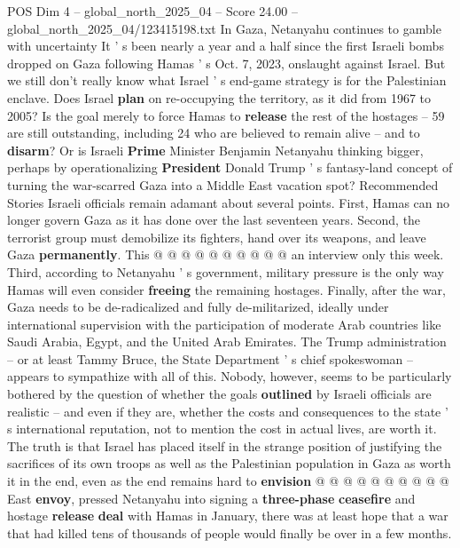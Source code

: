 \begin{textsample}{POS Dim 4 – global\_north\_2025\_04 – Score 24.00 – global\_north\_2025\_04/123415198.txt}  \label{ex:f4_pos_215}
In Gaza, Netanyahu continues to gamble with uncertainty It ' s been nearly a year and a half since the first Israeli bombs dropped on Gaza following Hamas ' s Oct. 7, 2023, onslaught against Israel.
But we still don't really know what Israel ' s end-game strategy is for the Palestinian enclave.
Does Israel \textbf{plan} on re-occupying the territory, as it did from 1967 to 2005?
Is the goal merely to force Hamas to \textbf{release} the rest of the hostages -- 59 are still outstanding, including 24 who are believed to remain alive -- and to \textbf{disarm}?
Or is Israeli \textbf{Prime} Minister Benjamin Netanyahu thinking bigger, perhaps by operationalizing \textbf{President} Donald Trump ' s fantasy-land concept of turning the war-scarred Gaza into a Middle East vacation spot?
Recommended Stories Israeli officials remain adamant about several points.
First, Hamas can no longer govern Gaza as it has done over the last seventeen years.
Second, the terrorist group must demobilize its fighters, hand over its weapons, and leave Gaza \textbf{permanently}.
This @ @ @ @ @ @ @ @ @ @ an interview only this week.
Third, according to Netanyahu ' s government, military pressure is the only way Hamas will even consider \textbf{freeing} the remaining hostages.
Finally, after the war, Gaza needs to be de-radicalized and fully de-militarized, ideally under international supervision with the participation of moderate Arab countries like Saudi Arabia, Egypt, and the United Arab Emirates.
The Trump administration -- or at least Tammy Bruce, the State Department ' s chief spokeswoman -- appears to sympathize with all of this.
Nobody, however, seems to be particularly bothered by the question of whether the goals \textbf{outlined} by Israeli officials are realistic -- and even if they are, whether the costs and consequences to the state ' s international reputation, not to mention the cost in actual lives, are worth it.
The truth is that Israel has placed itself in the strange position of justifying the sacrifices of its own troops as well as the Palestinian population in Gaza as worth it in the end, even as the end remains hard to \textbf{envision} @ @ @ @ @ @ @ @ @ @ East \textbf{envoy}, pressed Netanyahu into signing a \textbf{three-phase} \textbf{ceasefire} and hostage \textbf{release} \textbf{deal} with Hamas in January, there was at least hope that a war that had killed tens of thousands of people would finally be over in a few months.

\end{textsample}
